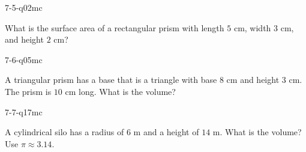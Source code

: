 \begin{practiceQuestion}{7-5-q02}{mc}
\begin{questionText}
What is the surface area of a rectangular prism with length $5$ cm, width $3$ cm, and height $2$ cm?
\end{questionText}
\end{practiceQuestion}

\begin{practiceQuestion}{7-6-q05}{mc}
\begin{questionText}
A triangular prism has a base that is a triangle with base $8$ cm and height $3$ cm. The prism is $10$ cm long. What is the volume?
\end{questionText}
\end{practiceQuestion}

\begin{practiceQuestion}{7-7-q17}{mc}
\begin{questionText}
A cylindrical silo has a radius of $6$ m and a height of $14$ m. What is the volume? Use $\pi \approx 3.14$.
\end{questionText}
\end{practiceQuestion}

